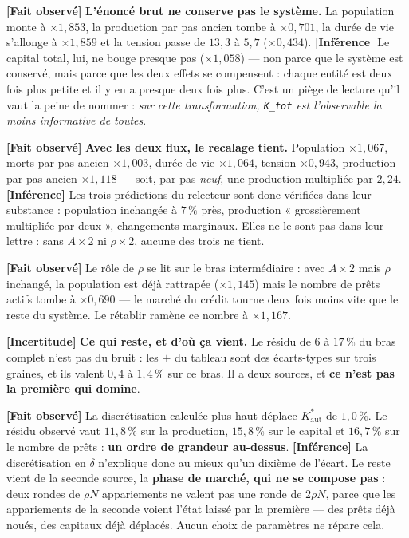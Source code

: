 \documentclass[11pt,a4paper]{article}
\newcommand{\code}[1]{\texttt{#1}}
\newcommand{\Kaut}{K^{*}_{\mathrm{aut}}}
\newcommand{\fait}{\textbf{[Fait observé]}}
\newcommand{\inference}{\textbf{[Inférence]}}
\newcommand{\incertitude}{\textbf{[Incertitude]}}
\begin{document}
\fait{} \textbf{L'énoncé brut ne conserve pas le système.} La population monte
à $\times 1{,}853$, la production par pas ancien tombe à $\times 0{,}701$, la
durée de vie s'allonge à $\times 1{,}859$ et la tension passe de $13{,}3$ à
$5{,}7$ ($\times 0{,}434$). \inference{} Le capital total, lui, ne bouge
presque pas ($\times 1{,}058$) --- non parce que le système est conservé, mais
parce que les deux effets se compensent : chaque entité est deux fois plus
petite et il y en a presque deux fois plus. C'est un piège de lecture
qu'il vaut la peine de nommer : \emph{sur cette transformation, \code{K\_tot}
est l'observable la moins informative de toutes}.

\fait{} \textbf{Avec les deux flux, le recalage tient.} Population
$\times 1{,}067$, morts par pas ancien $\times 1{,}003$, durée de vie
$\times 1{,}064$, tension $\times 0{,}943$, production par pas ancien
$\times 1{,}118$ --- soit, par pas \emph{neuf}, une production multipliée par
$2{,}24$. \inference{} Les trois prédictions du relecteur sont donc vérifiées
dans leur substance : population inchangée à $7\,\%$ près, production
« grossièrement multipliée par deux », changements marginaux. Elles ne le sont
pas dans leur lettre : sans $A \times 2$ ni $\rho \times 2$, aucune des trois
ne tient.

\fait{} Le rôle de $\rho$ se lit sur le bras intermédiaire : avec
$A \times 2$ mais $\rho$ inchangé, la population est déjà rattrapée
($\times 1{,}145$) mais le nombre de prêts actifs tombe à $\times 0{,}690$ ---
le marché du crédit tourne deux fois moins vite que le reste du système.
Le rétablir ramène ce nombre à $\times 1{,}167$.

\incertitude{} \textbf{Ce qui reste, et d'où ça vient.} Le résidu de $6$ à
$17\,\%$ du bras complet n'est pas du bruit : les $\pm$ du tableau sont des
écarts-types sur trois graines, et ils valent $0{,}4$ à $1{,}4\,\%$ sur ce
bras. Il a deux sources, et \textbf{ce n'est pas la première qui domine}.

\fait{} La discrétisation calculée plus haut déplace $\Kaut$ de $1{,}0\,\%$.
Le résidu observé vaut $11{,}8\,\%$ sur la production, $15{,}8\,\%$ sur le
capital et $16{,}7\,\%$ sur le nombre de prêts : \textbf{un ordre de grandeur
au-dessus}. \inference{} La discrétisation en $\delta$ n'explique donc au
mieux qu'un dixième de l'écart. Le reste vient de la seconde source, la
\textbf{phase de marché, qui ne se compose pas} : deux rondes de $\rho N$
appariements ne valent pas une ronde de $2\rho N$, parce que les appariements
de la seconde voient l'état laissé par la première --- des prêts déjà noués,
des capitaux déjà déplacés. Aucun choix de paramètres ne répare cela.
\end{document}

